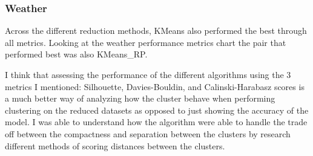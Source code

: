 \documentclass[conference]{IEEEtran}
\begin{document}
\subsubsection{Weather}{
Across the different reduction methods, KMeans also performed the best through all metrics. Looking at the weather performance metrics chart the pair that performed best was also KMeans\_RP.
}
\par I think that assessing the performance of the different algorithms using the 3 metrics I mentioned: Silhouette, Davies-Bouldin, and Calinski-Harabasz scores is a much better way of analyzing how the cluster behave when performing clustering on the reduced datasets as opposed to just showing the accuracy of the model. I was able to understand how the algorithm were able to handle the trade off between the compactness and separation between the clusters by research different methods of scoring distances between the clusters.
\end{document}
